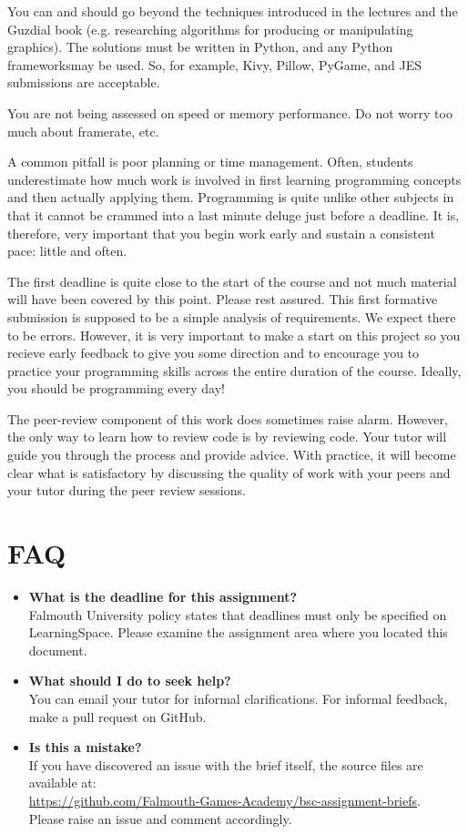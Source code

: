 \documentclass{../fal_assignment}
\begin{document}
You can and should go beyond the techniques introduced in the lectures and the Guzdial book (e.g. researching algorithms for producing or manipulating graphics). The solutions must be written in Python, and any Python frameworksmay be used. So, for example, Kivy, Pillow, PyGame, and JES submissions are acceptable.

You are not being assessed on speed or memory performance. Do not worry too much about framerate, etc.

A common pitfall is poor planning or time management. Often, students underestimate how much work is involved in first learning programming concepts and then actually applying them. Programming is quite unlike other subjects in that it cannot be crammed into a last minute deluge just before a deadline. It is, therefore, very important that you begin work early and sustain a consistent pace: little and often.

The first deadline is quite close to the start of the course and not much material will have been covered by this point. Please rest assured. This first formative submission is supposed to be a simple analysis of requirements. We expect there to be errors. However, it is very important to make a start on this project so you recieve early feedback to give you some direction and to encourage you to practice your programming skills across the entire duration of the course. Ideally, you should be programming every day!

The peer-review component of this work does sometimes raise alarm. However, the only way to learn how to review code is by reviewing code. Your tutor will guide you through the process and provide advice. With practice, it will become clear what is satisfactory by discussing the quality of work with your peers and your tutor during the peer review sessions. 

\section*{FAQ}

\begin{itemize}
	\item 	\textbf{What is the deadline for this assignment?} \\ 
    		Falmouth University policy states that deadlines must only be specified on LearningSpace. Please examine the assignment area where you located this document.
    		
	\item 	\textbf{What should I do to seek help?} \\ 
    		You can email your tutor for informal clarifications. For informal feedback, make a pull request on GitHub. 
    		
    	\item 	\textbf{Is this a mistake?} \\ 	
    		If you have discovered an issue with the brief itself, the source files are available at: \\
    		\url{https://github.com/Falmouth-Games-Academy/bsc-assignment-briefs}.\\
    		 Please raise an issue and comment accordingly.
\end{itemize}
\end{document}
